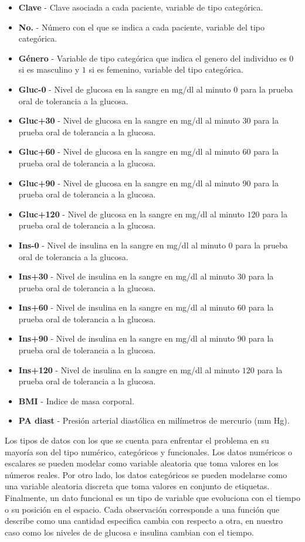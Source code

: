 \begin{itemize}
    \item \textbf{Clave} - Clave asociada a cada paciente, variable de tipo categórica.
    \item \textbf{No.} - Número con el que se indica a cada paciente, variable del tipo categórica.
    \item \textbf{Género} - Variable de tipo categórica que indica el genero del individuo es $0$ si es masculino y $1$ si es femenino, variable del tipo categórica.
    \item \textbf{Gluc-0} - Nivel de glucosa en la sangre en mg/dl al minuto $0$ para la prueba oral de tolerancia a la glucosa.
    \item \textbf{Gluc+30} - Nivel de glucosa en la sangre en mg/dl al minuto $30$ para la prueba oral de tolerancia a la glucosa.
    \item \textbf{Gluc+60} - Nivel de glucosa en la sangre en mg/dl al minuto $60$ para la prueba oral de tolerancia a la glucosa.
    \item \textbf{Gluc+90} - Nivel de glucosa en la sangre en mg/dl al minuto $90$ para la prueba oral de tolerancia a la glucosa.
    \item \textbf{Gluc+120} - Nivel de glucosa en la sangre en mg/dl al minuto $120$ para la prueba oral de tolerancia a la glucosa.
    \item \textbf{Ins-0} - Nivel de insulina en la sangre en mg/dl al minuto $0$ para la prueba oral de tolerancia a la glucosa.
    \item \textbf{Ins+30} - Nivel de insulina en la sangre en mg/dl al minuto $30$ para la prueba oral de tolerancia a la glucosa.
    \item \textbf{Ins+60} - Nivel de insulina en la sangre en mg/dl al minuto $60$ para la prueba oral de tolerancia a la glucosa.
    \item \textbf{Ins+90} - Nivel de insulina en la sangre en mg/dl al minuto $90$ para la prueba oral de tolerancia a la glucosa.
    \item \textbf{Ins+120} - Nivel de insulina en la sangre en mg/dl al minuto $120$ para la prueba oral de tolerancia a la glucosa.
    \item \textbf{BMI} - Indice de masa corporal.
    \item \textbf{PA diast} - Presión arterial diastólica en milímetros de mercurio (mm Hg).
\end{itemize}

Los tipos de datos con los que se cuenta para enfrentar el problema en su mayoría son del tipo numérico, categóricos y funcionales. Los datos numéricos o escalares se pueden modelar como variable aleatoria que toma valores en los números reales. Por otro lado, los datos categóricos se pueden modelarse como una variable aleatoria discreta que toma valores en conjunto de  etiquetas. Finalmente, un dato funcional es un tipo de variable que evoluciona con el tiempo o su posición en el espacio. Cada observación corresponde a una función que describe como una cantidad especifica cambia con respecto a otra, en nuestro caso como los niveles de de glucosa e insulina cambian con el tiempo.

